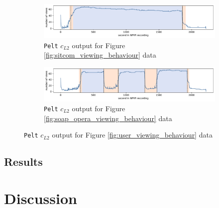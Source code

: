 \begin{figure}[h]
    \centering
    \begin{subfigure}[b]{\textwidth}
       \includegraphics[width=1\textwidth]{../plots/sitcom-pelt_l2_pen30000.pdf}
       \caption{\texttt{Pelt} $c_{L2}$ output for Figure \ref{fig:sitcom_viewing_behaviour} data}
       \label{fig:pelt_sitcom} 
    \end{subfigure}
    
    \begin{subfigure}[b]{\textwidth}
       \includegraphics[width=1\textwidth]{../plots/soap_opera-pelt_l2_pen30000.pdf}
       \caption{\texttt{Pelt} $c_{L2}$ output for Figure \ref{fig:soap_opera_viewing_behaviour} data}
       \label{fig:pelt_soap_opera}
    \end{subfigure}
    \caption{\texttt{Pelt} $c_{L2}$ output for Figure \ref{fig:user_viewing_behaviour} data}
    \label{fig:ruptures_change_detection}
\end{figure}



\subsection{Results} \label{sec:results}

\section{Discussion} \label{sec:discussion}

